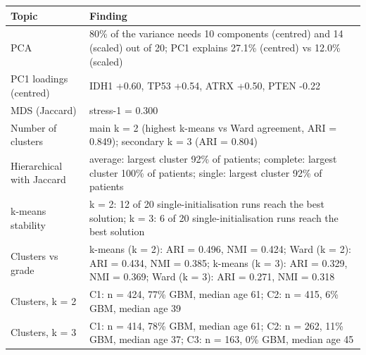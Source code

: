 \begin{tabular}{lp{12cm}}
\toprule
\textbf{Topic} & \textbf{Finding} \\
\midrule
PCA & 80\% of the variance needs 10 components (centred) and 14 (scaled) out of 20; PC1 explains 27.1\% (centred) vs 12.0\% (scaled) \\
PC1 loadings (centred) & IDH1 +0.60, TP53 +0.54, ATRX +0.50, PTEN -0.22 \\
MDS (Jaccard) & stress-1 = 0.300 \\
Number of clusters & main k = 2 (highest k-means vs Ward agreement, ARI = 0.849); secondary k = 3 (ARI = 0.804) \\
Hierarchical with Jaccard & average: largest cluster 92\% of patients; complete: largest cluster 100\% of patients; single: largest cluster 92\% of patients \\
k-means stability & k = 2: 12 of 20 single-initialisation runs reach the best solution; k = 3: 6 of 20 single-initialisation runs reach the best solution \\
Clusters vs grade & k-means (k = 2): ARI = 0.496, NMI = 0.424; Ward (k = 2): ARI = 0.434, NMI = 0.385; k-means (k = 3): ARI = 0.329, NMI = 0.369; Ward (k = 3): ARI = 0.271, NMI = 0.318 \\
Clusters, k = 2 & C1: n = 424, 77\% GBM, median age 61; C2: n = 415, 6\% GBM, median age 39 \\
Clusters, k = 3 & C1: n = 414, 78\% GBM, median age 61; C2: n = 262, 11\% GBM, median age 37; C3: n = 163, 0\% GBM, median age 45 \\
\bottomrule
\end{tabular}
